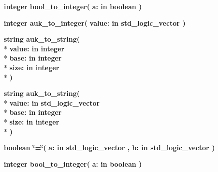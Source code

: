 \begin{DoxyCompactItemize}
\item 
{\bfseries {\bfseries \textcolor{comment}{integer}\textcolor{vhdlchar}{ }}} {\bf bool\+\_\+to\+\_\+integer}{\bfseries  ( }{\bfseries \textcolor{vhdlchar}{a\+: }\textcolor{stringliteral}{in }{\bfseries \textcolor{comment}{boolean}\textcolor{vhdlchar}{ }}}{\bfseries  )} 
\item 
{\bfseries {\bfseries \textcolor{comment}{integer}\textcolor{vhdlchar}{ }}} {\bf auk\+\_\+to\+\_\+integer}{\bfseries  ( }{\bfseries \textcolor{vhdlchar}{value\+: }\textcolor{stringliteral}{in }{\bfseries \textcolor{comment}{std\+\_\+logic\+\_\+vector}\textcolor{vhdlchar}{ }}}{\bfseries  )} 
\item 
{\bfseries {\bfseries \textcolor{comment}{string}\textcolor{vhdlchar}{ }}} {\bf auk\+\_\+to\+\_\+string}{\bfseries  ( }\\*
{\bfseries \textcolor{vhdlchar}{value\+: }\textcolor{stringliteral}{in }{\bfseries \textcolor{comment}{integer}\textcolor{vhdlchar}{ }}}\\*
{\bfseries \textcolor{vhdlchar}{base\+: }\textcolor{stringliteral}{in }{\bfseries \textcolor{comment}{integer}\textcolor{vhdlchar}{ }}}\\*
{\bfseries \textcolor{vhdlchar}{size\+: }\textcolor{stringliteral}{in }{\bfseries \textcolor{comment}{integer}\textcolor{vhdlchar}{ }}}\\*
{\bfseries  )} 
\item 
{\bfseries {\bfseries \textcolor{comment}{string}\textcolor{vhdlchar}{ }}} {\bf auk\+\_\+to\+\_\+string}{\bfseries  ( }\\*
{\bfseries \textcolor{vhdlchar}{value\+: }\textcolor{stringliteral}{in }{\bfseries \textcolor{comment}{std\+\_\+logic\+\_\+vector}\textcolor{vhdlchar}{ }}}\\*
{\bfseries \textcolor{vhdlchar}{base\+: }\textcolor{stringliteral}{in }{\bfseries \textcolor{comment}{integer}\textcolor{vhdlchar}{ }}}\\*
{\bfseries \textcolor{vhdlchar}{size\+: }\textcolor{stringliteral}{in }{\bfseries \textcolor{comment}{integer}\textcolor{vhdlchar}{ }}}\\*
{\bfseries  )} 
\item 
{\bfseries {\bfseries \textcolor{comment}{boolean}\textcolor{vhdlchar}{ }}} {\bf \char`\"{}=\char`\"{}}{\bfseries  ( }{\bfseries \textcolor{vhdlchar}{a\+: }\textcolor{stringliteral}{in }{\bfseries \textcolor{comment}{std\+\_\+logic\+\_\+vector}\textcolor{vhdlchar}{ }}}{\bfseries  , \textcolor{vhdlchar}{b\+: }\textcolor{stringliteral}{in }{\bfseries \textcolor{comment}{std\+\_\+logic\+\_\+vector}\textcolor{vhdlchar}{ }}}{\bfseries  )} 
\item 
{\bfseries {\bfseries \textcolor{comment}{integer}\textcolor{vhdlchar}{ }}} {\bf bool\+\_\+to\+\_\+integer}{\bfseries  ( }{\bfseries \textcolor{vhdlchar}{a\+: }\textcolor{stringliteral}{in }{\bfseries \textcolor{comment}{boolean}\textcolor{vhdlchar}{ }}}{\bfseries  )} 
\end{DoxyCompactItemize}

